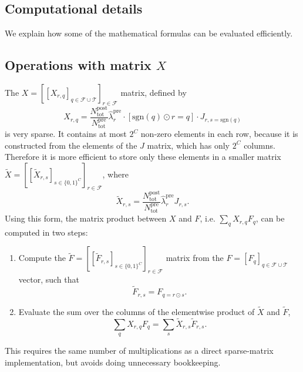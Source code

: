 \documentclass[letter,10pt,oneside]{article}
\newcommand{\be}{\begin{equation*}}
\newcommand{\ee}{\end{equation*}}
\newcommand{\+}{^\dagger}
\begin{document}
\begin{appendix}


\section{Computational details}
We explain how some of the mathematical formulas can be evaluated efficiently.

\subsection{Operations with matrix $X$}
The $X = [[X_{r,q}]_{q \in \mathcal{F}\cup \mathcal{T}}]_{r\in\mathcal{F}}$ matrix, defined by 
\be
  X_{r,q} = \frac{N_\text{tot}^\text{post}}{N_\text{tot}^\text{pre}}\hat\lambda_r^\text{pre} \cdot [\text{sgn}(q)\odot r = q]\cdot J_{r,s=\text{sgn}(q)}
\ee
is very sparse. It contains at most $2^C$ non-zero elements in each row, because it is constructed from the elements of the $J$ matrix, which has only $2^C$ columns. Therefore it is more efficient to store only these elements in a smaller matrix $\tilde X = [[\tilde X_{r,s}]_{s \in \{0,1\}^C}]_{r\in\mathcal{F}}$, where
\be
  \tilde X_{r,s} = \frac{N_\text{tot}^\text{post}}{N_\text{tot}^\text{pre}}\hat\lambda_r^\text{pre} J_{r,s}.
\ee
Using this form, the matrix product between $X$ and $F$, i.e. $\sum_q X_{r,q} F_{q}$, can be computed in two steps:
\begin{enumerate}
  \item Compute the $\tilde F = [[\tilde F_{r,s}]_{s \in \{0,1\}^C}]_{r\in\mathcal{F}}$ matrix from the $F = [F_q]_{q\in\mathcal{F}\cup \mathcal{T}}$ vector, such that
  \be
    \tilde F_{r,s} = F_{q=r\odot s}.
  \ee

  \item Evaluate the sum over the columns of the elementwise product of $\tilde X$ and $\tilde F$,
  \be
    \sum_q X_{r,q} F_{q} = \sum_s \tilde X_{r,s} \tilde F_{r,s}.
  \ee
\end{enumerate}
This requires the same number of multiplications as a direct sparse-matrix implementation, but avoids doing unnecessary bookkeeping.


\end{appendix}
\end{document}
